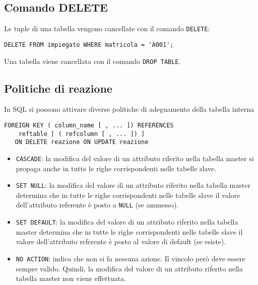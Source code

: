 \documentclass[a4paper, 10pt]{article}
\begin{document}
	\subsection{Comando DELETE}
		Le tuple di una tabella vengono cancellate con il comando \lstinline|DELETE|:
		\begin{lstlisting}
DELETE FROM impiegato WHERE matricola = 'A001';
		\end{lstlisting}
		Una tabella viene cancellata con il comando \lstinline|DROP TABLE|.
		
	\subsection{Politiche di reazione}
		In SQL si possono attivare diverse politiche di adeguamento della tabella
		interna
		\begin{lstlisting}
FOREIGN KEY ( column_name [ , ... ]) REFERENCES
	reftable [ ( refcolumn [ , ... ]) ]
   ON DELETE reazione ON UPDATE reazione
		\end{lstlisting}
		\begin{itemize}
			\item \lstinline|CASCADE|: la modifica del valore di un attributo riferito nella tabella master
			si propaga anche in tutte le righe corrispondenti nelle tabelle slave.

			\item \lstinline|SET NULL|: la modifica del valore di un attributo riferito nella tabella
			master determina che in tutte le righe corrispondenti nelle tabelle slave
			il valore dell’attributo referente è posto a \lstinline|NULL| (se ammesso).

			\item \lstinline|SET DEFAULT|: la modifica del valore di un attributo riferito nella tabella
			master determina che in tutte le righe corrispondenti nelle tabelle slave
			il valore dell’attributo referente è posto al valore di default (se esiste).

			\item \lstinline|NO ACTION|: indica che non si fa nessuna azione. Il vincolo però deve
			essere sempre valido. Quindi, la modifica del valore di un attributo
			riferito nella tabella master non viene effettuata.
		\end{itemize}
\end{document}

